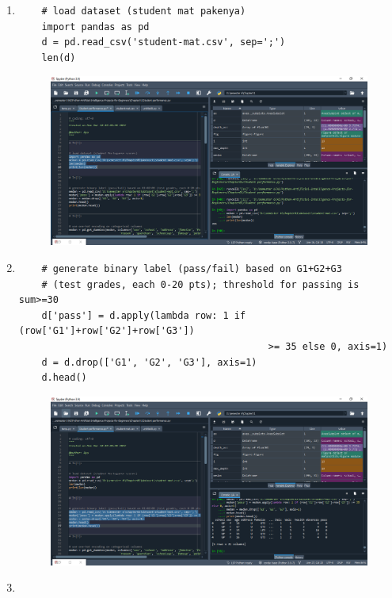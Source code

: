 \begin{enumerate}

\item
\begin{verbatim}
	# load dataset (student mat pakenya)
	import pandas as pd
	d = pd.read_csv('student-mat.csv', sep=';')
	len(d)
\end{verbatim}
\begin{figure}[!htbp]
	\centering
	\includegraphics[scale=0.4]{figures/chapter 2/1.PNG}
\end{figure}
\newpage
\item
\begin{verbatim}
	# generate binary label (pass/fail) based on G1+G2+G3 
	# (test grades, each 0-20 pts); threshold for passing is sum>=30
	d['pass'] = d.apply(lambda row: 1 if (row['G1']+row['G2']+row['G3']) 
											>= 35 else 0, axis=1)
	d = d.drop(['G1', 'G2', 'G3'], axis=1)
	d.head()
\end{verbatim}
\begin{figure}[!htbp]
	\centering
	\includegraphics[scale=0.4]{figures/chapter 2/2.PNG}
\end{figure}
\newpage
\item
\begin{verbatim}

\end{verbatim}
\end{enumerate}
